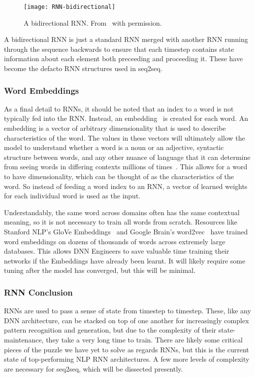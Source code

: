 \begin{figure}[h]
  \centering
  \texttt{[image: RNN-bidirectional]}
  \caption[Bidirectional RNN]{A bidirectional RNN. From~\cite{Olah2015} with permission.}
  \label{fig:bidir}
\end{figure}

A bidirectional RNN is just a standard RNN merged with another RNN running through the sequence backwards to ensure that each timestep contains state information about each element both preceeding and proceeding it. These have become the defacto RNN structures used in seq2seq.

\subsubsection{Word Embeddings}\label{emb}
As a final detail to RNNs, it should be noted that an index to a word is not typically fed into the RNN. Instead, an embedding~\cite{Mikolov2000} is created for each word. An embedding is a vector of arbitrary dimensionality that is used to describe characteristics of the word. The values in these vectors will ultimately allow the model to understand whether a word is a noun or an adjective, syntactic structure between words, and any other nuance of language that it can determine from seeing words in differing contexts millions of times~\cite{Bengio2003}. This allows for a word to have dimensionality, which can be thought of as the characteristics of the word. So instead of feeding a word index to an RNN, a vector of learned weights for each individual word is used as the input.

Understandably, the same word across domains often has the same contextual meaning, so it is not necessary to train all words from scratch. Resources like Stanford NLP's GloVe Embeddings~\cite{Pennington2014} and Google Brain's word2vec~\cite{Mikolov2013} have trained word embeddings on dozens of thousands of words across extremely large databases. This allows DNN Engineers to save valuable time training their networks if the Embeddings have already been learnt. It will likely require some tuning after the model has converged, but this will be minimal.

\subsubsection{RNN Conclusion}
RNNs are used to pass a sense of state from timestep to timestep. These, like any DNN architecture, can be stacked on top of one another for increasingly complex pattern recognition and generation, but due to the complexity of their state-maintenance, they take a very long time to train. There are likely some critical pieces of the puzzle we have yet to solve as regards RNNs, but this is the current state of top-performing NLP RNN architectures. A few more levels of complexity are necessary for seq2seq, which will be dissected presently.


